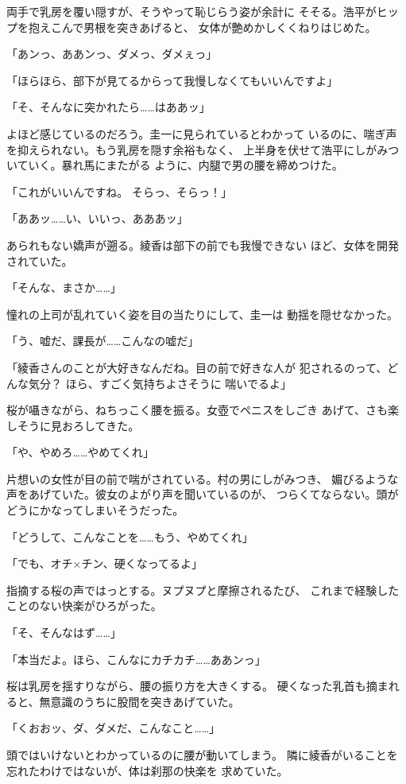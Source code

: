 ﻿\documentclass[
    book,tate,
    line_length=30zw,
    jafontsize=12pt,
    paper=b5j,
    landscape,
    ]{jlreq}
\begin{document}
両手で乳房を覆い隠すが、そうやって恥じらう姿が余計に
そそる。浩平がヒップを抱えこんで男根を突きあげると、
女体が艶めかしくくねりはじめた。

「あンっ、ああンっ、ダメっ、ダメぇっ」

「ほらほら、部下が見てるからって我慢しなくてもいいんですよ」

「そ、そんなに突かれたら……はああッ」

よほど感じているのだろう。圭一に見られているとわかって
いるのに、喘ぎ声を抑えられない。もう乳房を隠す余裕もなく、
上半身を伏せて浩平にしがみついていく。暴れ馬にまたがる
ように、内腿で男の腰を締めつけた。

「これがいいんですね。 そらっ、そらっ！」

「ああッ……い、いいっ、あああッ」

あられもない嬌声が遡る。綾香は部下の前でも我慢できない
ほど、女体を開発されていた。

「そんな、まさか……」

憧れの上司が乱れていく姿を目の当たりにして、圭一は
動揺を隠せなかった。

「う、嘘だ、課長が……こんなの嘘だ」

「綾香さんのことが大好きなんだね。目の前で好きな人が
犯されるのって、どんな気分？ ほら、すごく気持ちよさそうに
喘いでるよ」

桜が囁きながら、ねちっこく腰を振る。女壺でペニスをしごき
あげて、さも楽しそうに見おろしてきた。

「や、やめろ……やめてくれ」

片想いの女性が目の前で喘がされている。村の男にしがみつき、
媚びるような声をあげていた。彼女のよがり声を聞いているのが、
つらくてならない。頭がどうにかなってしまいそうだった。

「どうして、こんなことを……もう、やめてくれ」

「でも、オチ×チン、硬くなってるよ」

指摘する桜の声ではっとする。ヌプヌプと摩擦されるたび、
これまで経験したことのない快楽がひろがった。

「そ、そんなはず……」

「本当だよ。ほら、こんなにカチカチ……ああンっ」

桜は乳房を揺すりながら、腰の振り方を大きくする。
硬くなった乳首も摘まれると、無意識のうちに股間を突きあげていた。

「くおおッ、ダ、ダメだ、こんなこと……」

頭ではいけないとわかっているのに腰が動いてしまう。
隣に綾香がいることを忘れたわけではないが、体は刹那の快楽を
求めていた。
\end{document}
